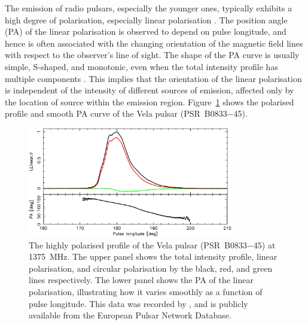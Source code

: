 The emission of radio pulsars, especially the younger ones, typically exhibits a high degree of polarisation, especially linear polarisation \citep[e.g.][]{QMLG1995, CMKx2001}. The position angle (PA) of the linear polarisation is observed to depend on pulse longitude, and hence is often associated with the changing orientation of the magnetic field lines with respect to the observer's line of sight. The shape of the PA curve is usually simple, S-shaped, and monotonic, even when the total intensity profile has multiple components \citep{WCL+1999}. This implies that the orientation of the linear polarisation is independent of the intensity of different sources of emission, affected only by the location of source within the emission region. Figure~\ref{fig: intro - vela polarisation} shows the polarised profile and smooth PA curve of the Vela pulsar (PSR~B0833$-$45).
\begin{figure}
    \begin{center}
        \includegraphics[width=0.8\textwidth]{Figures/Introduction/vela.png}
        \caption[The polarisation properties of the Vela pulsar]{The highly polarised profile of the Vela pulsar (PSR~B0833$-$45) at 1375~MHz. The upper panel shows the total intensity profile, linear polarisation, and circular polarisation by the black, red, and green lines respectively. The lower panel shows the PA of the linear polarisation, illustrating how it varies smoothly as a function of pulse longitude. This data was recorded by \citet{KJxx2006}, and is publicly available from the European Pulsar Network Database\footnotemark.}
        \label{fig: intro - vela polarisation}
    \end{center}
\end{figure}

